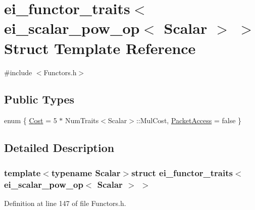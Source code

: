 \hypertarget{structei__functor__traits_3_01ei__scalar__pow__op_3_01_scalar_01_4_01_4}{\section{ei\-\_\-functor\-\_\-traits$<$ ei\-\_\-scalar\-\_\-pow\-\_\-op$<$ Scalar $>$ $>$ Struct Template Reference}
\label{structei__functor__traits_3_01ei__scalar__pow__op_3_01_scalar_01_4_01_4}
}


{\ttfamily \#include $<$Functors.\-h$>$}

\subsection*{Public Types}
\begin{DoxyCompactItemize}
\item 
enum \{ \hyperlink{structei__functor__traits_3_01ei__scalar__pow__op_3_01_scalar_01_4_01_4_a72a6670773d4d8fa750c53885522a1b2ad43a5a3274cb82add91ec8107a08c58b}{Cost} = 5 $\ast$ Num\-Traits$<$Scalar$>$\-:\-:Mul\-Cost, 
\hyperlink{structei__functor__traits_3_01ei__scalar__pow__op_3_01_scalar_01_4_01_4_a72a6670773d4d8fa750c53885522a1b2a3eeb203540fb5427c3688aeb21f13648}{Packet\-Access} = false
 \}
\end{DoxyCompactItemize}


\subsection{Detailed Description}
\subsubsection*{template$<$typename Scalar$>$struct ei\-\_\-functor\-\_\-traits$<$ ei\-\_\-scalar\-\_\-pow\-\_\-op$<$ Scalar $>$ $>$}



Definition at line 147 of file Functors.\-h.




